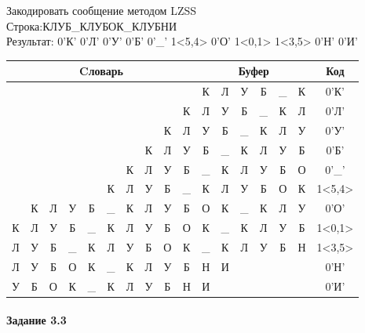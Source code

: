 \documentclass[a4paper, 12pt]{article}
\begin{document}
Закодировать сообщение методом LZSS\\
Строка:КЛУБ\_КЛУБОК\_КЛУБНИ\\
Результат: 0'К' 0'Л' 0'У' 0'Б' 0'\_' 1<5,4> 0'О' 1<0,1> 1<3,5> 0'Н' 0'И'\\
\begin{table}[h!]
\centering
\begin{tabular}{|c|c|c|c|c|c|c|c|c|c|c|c|c|c|c|c|c|}
\hline
\multicolumn{10}{|c|}{Cловарь} & \multicolumn{6}{c|}{Буфер} & Код  \\ \hline
  &   &   &   &   &   &   &   &   &   & К & Л & У & Б & \_ & К & 0'К'\\ \hline
  &   &   &   &   &   &   &   &   & К & Л & У & Б & \_ & К & Л & 0'Л'\\ \hline
  &   &   &   &   &   &   &   & К & Л & У & Б & \_ & К & Л & У & 0'У'\\ \hline
  &   &   &   &   &   &   & К & Л & У & Б & \_ & К & Л & У & Б & 0'Б'\\ \hline
  &   &   &   &   &   & К & Л & У & Б & \_ & К & Л & У & Б & О & 0'\_'\\ \hline
  &   &   &   &   & \cellcolor[HTML]{FFFF00} К & \cellcolor[HTML]{FFFF00} Л & \cellcolor[HTML]{FFFF00} У & \cellcolor[HTML]{FFFF00} Б & \_ & \cellcolor[HTML]{FFFF00} К & \cellcolor[HTML]{FFFF00} Л & \cellcolor[HTML]{FFFF00} У & \cellcolor[HTML]{FFFF00} Б & О & К & 1<5,4>\\ \hline
  & К & Л & У & Б & \_ & К & Л & У & Б & О & К & \_ & К & Л & У & 0'О'\\ \hline
\cellcolor[HTML]{FFFF00} К & Л & У & Б & \_ & К & Л & У & Б & О & \cellcolor[HTML]{FFFF00} К & \_ & К & Л & У & Б & 1<0,1>\\ \hline
Л & У & Б & \cellcolor[HTML]{FFFF00} \_ & \cellcolor[HTML]{FFFF00} К & \cellcolor[HTML]{FFFF00} Л & \cellcolor[HTML]{FFFF00} У & \cellcolor[HTML]{FFFF00} Б & О & К & \cellcolor[HTML]{FFFF00} \_ & \cellcolor[HTML]{FFFF00} К & \cellcolor[HTML]{FFFF00} Л & \cellcolor[HTML]{FFFF00} У & \cellcolor[HTML]{FFFF00} Б & Н & 1<3,5>\\ \hline
Л & У & Б & О & К & \_ & К & Л & У & Б & Н & И &   &   &   &   & 0'Н'\\ \hline
У & Б & О & К & \_ & К & Л & У & Б & Н & И &   &   &   &   &   & 0'И'\\ \hline
\end{tabular}
\end{table}

\paragraph{Задание 3.3}
\end{document}
